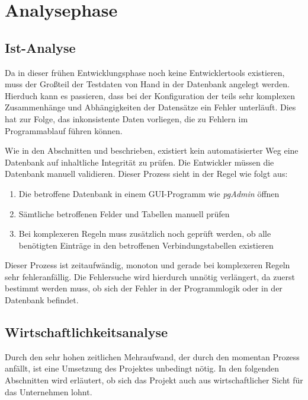 \section{Analysephase} 
\label{sec:Analysephase}


\subsection{Ist-Analyse} 
\label{sec:IstAnalyse}

Da in dieser frühen Entwicklungsphase noch keine Entwicklertools existieren, muss der Großteil der Testdaten von Hand in der Datenbank angelegt werden. Hierduch kann es passieren, dass bei der Konfiguration der teils sehr komplexen Zusammenhänge und Abhängigkeiten der Datensätze ein Fehler unterläuft. Dies hat zur Folge, das inkonsistente Daten vorliegen, die zu Fehlern im Programmablauf führen können.

Wie in den Abschnitten  und  beschrieben, existiert kein automatisierter Weg eine Datenbank auf inhaltliche Integrität zu prüfen. Die Entwickler müssen die Datenbank manuell validieren. Dieser Prozess sieht in der Regel wie folgt aus:

\begin{enumerate}
	\item Die betroffene Datenbank in einem \acs{GUI}-Programm wie \textit{pgAdmin} öffnen
	\item Sämtliche betroffenen Felder und Tabellen manuell prüfen
	\item Bei komplexeren Regeln muss zusätzlich noch geprüft werden, ob alle benötigten Einträge in den betroffenen Verbindungstabellen existieren
\end{enumerate}

Dieser Prozess ist zeitaufwändig, monoton und gerade bei komplexeren Regeln sehr fehleranfällig. Die Fehlersuche wird hierdurch unnötig verlängert, da zuerst bestimmt werden muss, ob sich der Fehler in der Programmlogik oder in der Datenbank befindet.


\subsection{Wirtschaftlichkeitsanalyse}
\label{sec:Wirtschaftlichkeitsanalyse}

Durch den sehr hohen zeitlichen Mehraufwand, der durch den momentan Prozess anfällt, ist eine Umsetzung des Projektes unbedingt nötig. In den folgenden Abschnitten wird erläutert, ob sich das Projekt auch aus wirtschaftlicher Sicht für das Unternehmen lohnt.



